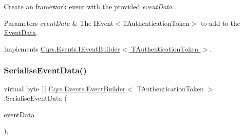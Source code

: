 Create an \hyperlink{}{framework event} with the provided {\itshape event\+Data} . 


\begin{DoxyParams}{Parameters}
{\em event\+Data} & The I\+Event$<$\+T\+Authentication\+Token$>$ to add to the \hyperlink{classCqrs_1_1Events_1_1EventData}{Event\+Data}.\\
\hline
\end{DoxyParams}


Implements \hyperlink{interfaceCqrs_1_1Events_1_1IEventBuilder_a3c0cb2db87e496ad64f481a6cce2c79d_a3c0cb2db87e496ad64f481a6cce2c79d}{Cqrs.\+Events.\+I\+Event\+Builder$<$ T\+Authentication\+Token $>$}.

\mbox{\label{classCqrs_1_1Events_1_1EventBuilder_a5392c1e86ea54fb96ee7af3a57f9af5a_a5392c1e86ea54fb96ee7af3a57f9af5a}} 
\subsubsection{\texorpdfstring{Serialise\+Event\+Data()}{SerialiseEventData()}}
{\footnotesize\ttfamily virtual byte \mbox{[}$\,$\mbox{]} \hyperlink{classCqrs_1_1Events_1_1EventBuilder}{Cqrs.\+Events.\+Event\+Builder}$<$ T\+Authentication\+Token $>$.Serialise\+Event\+Data (\begin{DoxyParamCaption}\item[{\hyperlink{interfaceCqrs_1_1Events_1_1IEvent}{I\+Event}$<$ T\+Authentication\+Token $>$}]{event\+Data }\end{DoxyParamCaption})\hspace{0.3cm}{\ttfamily [protected]}, {\ttfamily [virtual]}}

\mbox{\label{classCqrs_1_1Events_1_1EventBuilder_aefa7bfaea90123e143e108d46efc6603_aefa7bfaea90123e143e108d46efc6603}} 
